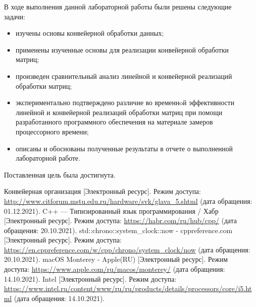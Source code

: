 \documentclass[a4paper,14pt, unknownkeysallowed]{extreport}
\begin{document}
\vspace{5mm}

В ходе выполнения данной лабораторной работы были решены следующие задачи:
\begin{itemize}
	\item изучены основы конвейерной обработки данных;
	\item применены изученные основы для реализации конвейерной обработки матриц;
	\item произведен сравнительный анализ линейной и конвейерной реализаций обработки матриц;
	\item экспериментально подтверждено различие во временнoй эффективности линейной и конвейерной реализаций обработки матриц при помощи разработанного программного обеспечения на материале замеров процессорного времени;
	\item описаны и обоснованы полученные результаты в отчете о выполненной лабораторной работе.
\end{itemize}

Поставленная цель была достигнута.





\begin{thebibliography}{5}
	Конвейерная организация [Электронный ресурс]. Режим доступа: \url{http://www.citforum.mstu.edu.ru/hardware/svk/glava_5.shtml} (дата обращения: 01.12.2021).
	C++ –– Типизированный язык программирования / Хабр [Электронный ресурс]. Режим доступа: \url{https://habr.com/ru/hub/cpp/} (дата обращения: 20.10.2021).
	std::chrono::system\_clock::now - cppreference.com [Электронный ресурс]. Режим доступа: \url{https://en.cppreference.com/w/cpp/chrono/system_clock/now} (дата обращения: 20.10.2021).
	macOS Monterey - Apple(RU) [Электронный ресурс]. Режим доступа: \url{https://www.apple.com/ru/macos/monterey/} (дата обращения: 14.10.2021).
	Intel [Электронный ресурс]. Режим доступа: \url{https://www.intel.ru/content/www/ru/ru/products/details/processors/core/i5.html} (дата обращения: 14.10.2021).
\end{thebibliography}

\end{document}
